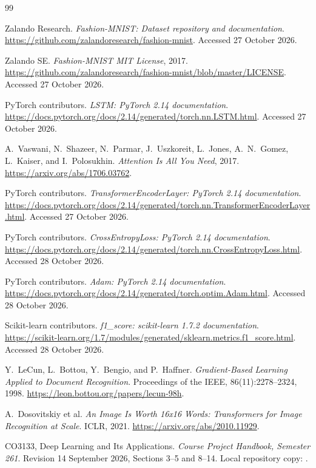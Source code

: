 \begin{thebibliography}{99}

Zalando Research.
\emph{Fashion-MNIST: Dataset repository and documentation}.
\url{https://github.com/zalandoresearch/fashion-mnist}.
Accessed 27 October 2026.

Zalando SE.
\emph{Fashion-MNIST MIT License}, 2017.
\url{https://github.com/zalandoresearch/fashion-mnist/blob/master/LICENSE}.
Accessed 27 October 2026.

PyTorch contributors.
\emph{LSTM: PyTorch 2.14 documentation}.
\url{https://docs.pytorch.org/docs/2.14/generated/torch.nn.LSTM.html}.
Accessed 27 October 2026.

A.~Vaswani, N.~Shazeer, N.~Parmar, J.~Uszkoreit, L.~Jones,
A.~N.~Gomez, L.~Kaiser, and I.~Polosukhin.
\emph{Attention Is All You Need}, 2017.
\url{https://arxiv.org/abs/1706.03762}.

PyTorch contributors.
\emph{TransformerEncoderLayer: PyTorch 2.14 documentation}.
\url{https://docs.pytorch.org/docs/2.14/generated/torch.nn.TransformerEncoderLayer.html}.
Accessed 27 October 2026.

PyTorch contributors.
\emph{CrossEntropyLoss: PyTorch 2.14 documentation}.
\url{https://docs.pytorch.org/docs/2.14/generated/torch.nn.CrossEntropyLoss.html}.
Accessed 28 October 2026.

PyTorch contributors.
\emph{Adam: PyTorch 2.14 documentation}.
\url{https://docs.pytorch.org/docs/2.14/generated/torch.optim.Adam.html}.
Accessed 28 October 2026.

Scikit-learn contributors.
\emph{f1\_score: scikit-learn 1.7.2 documentation}.
\url{https://scikit-learn.org/1.7/modules/generated/sklearn.metrics.f1_score.html}.
Accessed 28 October 2026.

Y.~LeCun, L.~Bottou, Y.~Bengio, and P.~Haffner.
\emph{Gradient-Based Learning Applied to Document Recognition}.
Proceedings of the IEEE, 86(11):2278--2324, 1998.
\url{https://leon.bottou.org/papers/lecun-98h}.

A.~Dosovitskiy et al.
\emph{An Image Is Worth 16x16 Words: Transformers for Image Recognition at Scale}.
ICLR, 2021.
\url{https://arxiv.org/abs/2010.11929}.

CO3133, Deep Learning and Its Applications.
\emph{Course Project Handbook, Semester 261}.
Revision 14 September 2026, Sections 3--5 and 8--14.
Local repository copy: .

\end{thebibliography}
